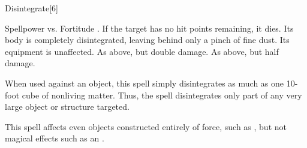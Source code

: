\begin{spellsection}{Disintegrate}[6]
    \begin{spellheader}
    \end{spellheader}
    \begin{spellcontent}
        \begin{spelltargetinginfo}
        \end{spelltargetinginfo}
        \begin{spelleffects}
            \begin{spellattack}{Spellpower vs. Fortitude}
                \spellsuccess {}. If the target has no hit points remaining, it dies. Its body is completely disintegrated, leaving behind only a pinch of fine dust. Its equipment is unaffected.
                \spellcritical As above, but double damage.
                \spellfailure As above, but half damage.
            \end{spellattack}
            \spellspecial When used against an object, this spell simply disintegrates as much as one 10-foot cube of nonliving matter. Thus, the spell disintegrates only part of any very large object or structure targeted.
        \end{spelleffects}
    \end{spellcontent}
    \begin{spellfooter}
        \spellnotes This spell affects even objects constructed entirely of force, such as , but not magical effects such as an .
        \miscastrandom
    \end{spellfooter}
    \begin{spellaugments}
    \end{spellaugments}
\end{spellsection}

